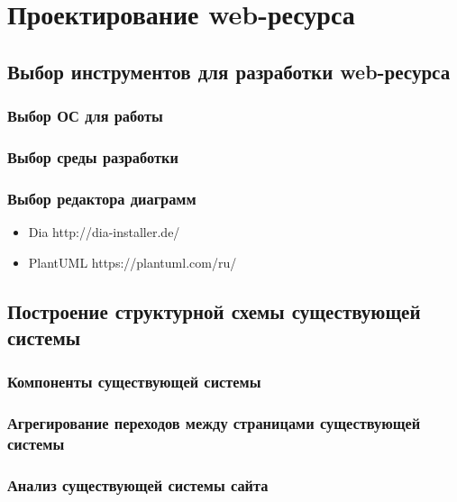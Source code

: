 \section{Проектирование web-ресурса}
    \subsection{Выбор инструментов для разработки web-ресурса}
        \subsubsection{Выбор ОС для работы}

        \subsubsection{Выбор среды разработки}

        \subsubsection{Выбор редактора диаграмм}
            \begin{itemize}
                \item Dia   http://dia-installer.de/
                \item PlantUML  https://plantuml.com/ru/
            \end{itemize}
        
    \subsection{Построение структурной схемы существующей системы}
        \subsubsection{Компоненты существующей системы}

        \subsubsection{Агрегирование переходов между страницами существующей системы}

        \subsubsection{Анализ существующей системы сайта}

